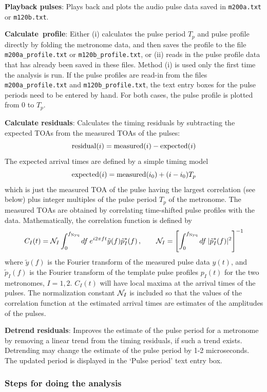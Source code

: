 \documentclass[10pt]{NSF}
\def\be{\begin{equation}}
\def\ee{\end{equation}}
\begin{document}
{\bf Playback pulses}:
Plays back and plots the audio pulse data saved in
{\tt m200a.txt} or {\tt m120b.txt}.

{\bf Calculate\ profile}:
Either 
(i) calculates the pulse period $T_p$ and pulse profile directly 
by folding the metronome data,
and then saves the profile to the file 
{\tt m200a\_profile.txt} or {\tt m120b\_profile.txt}, or 
(ii) reads in the pulse profile data that has already been saved 
in these files.
Method (i) is used only the first time the analysis is run.
If the pulse profiles are read-in from the files 
{\tt m200a\_profile.txt} and {\tt m120b\_profile.txt}, the text entry 
boxes for the pulse periods need to be entered by hand.
For both cases, the pulse profile is plotted from 0 to $T_p$.

{\bf Calculate residuals}:
Calculates the timing residuals by subtracting the expected 
TOAs from the measured TOAs of the pulses:
%
\be
{\rm residual}(i) = {\rm measured}(i) - {\rm expected}(i)
\ee
%
The expected arrival times are defined by a simple timing model
%
\be
{\rm expected}(i) = {\rm measured}(i_0) + (i-i_0)T_p
\ee
%
which is just the measured TOA of the pulse having the 
largest correlation (see below) plus 
integer multiples of the pulse period $T_p$ of the metronome.
The measured TOAs are obtained by correlating time-shifted 
pulse profiles with the data.
Mathematically, the correlation function is defined by
%
\be
C_I(t) ={\cal N}_I
\int_0^{f_{\rm Nyq}} df\> 
e^{i2\pi ft}\tilde y(f) \tilde p_I^*(f)\,,
\qquad
{\cal N}_I
=\left[\int_0^{f_{\rm Nyq}} df\> 
|\tilde p_I^*(f)|^2\right]^{-1}
\ee
%
where $\tilde y(f)$ is the Fourier transform of the
measured pulse data $y(t)$, and $\tilde p_I(f)$ is the
Fourier transform of the template pulse profiles
$p_I(t)$ for the two metronomes, $I=1,2$.
$C_I(t)$ will have local maxima at the arrival 
times of the pulses.
The normalization constant ${\cal N}_I$ is included  
so that the values of the correlation function at the 
estimated arrival times are estimates of the amplitudes
of the pulses.

{\bf Detrend residuals}:
Improves the estimate of the pulse period for 
a metronome by removing a linear trend 
from the timing residuals, if such a trend exists.
Detrending may change the estimate of the pulse period
by 1-2 microseconds.
The updated period is displayed in the `Pulse period'
text entry box.

\subsubsection{Steps for doing the analysis}
\end{document}
